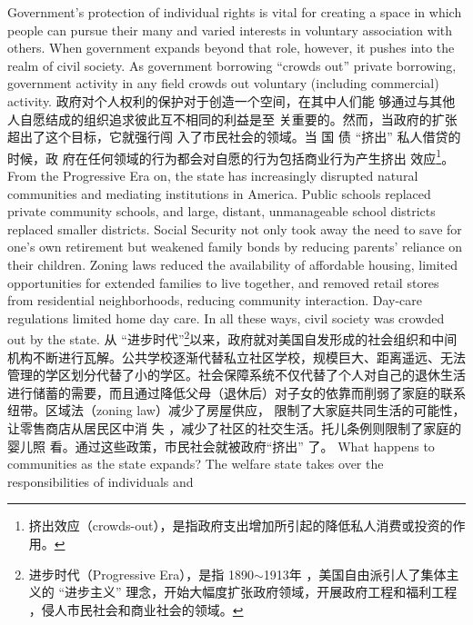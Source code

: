 \begin{paracol}{2}
Government's protection of individual rights is vital for creating a space in which people can pursue their many and varied
interests in voluntary association with others. When government expands beyond that role, however, it pushes into the
realm of civil society. As government borrowing ``crowds out''
private borrowing, government activity in any field crowds out
voluntary (including commercial) activity.
\switchcolumn
政府对个人权利的保护对于创造一个空间，在其中人们能
够通过与其他人自愿结成的组织追求彼此互不相同的利益是至
关重要的。然而，当政府的扩张超出了这个目标，它就强行闯
入了市民社会的领域。当 国 债 “挤出” 私人借贷的时候，政
府在任何领域的行为都会对自愿的行为包括商业行为产生挤出
效应\footnote{挤出效应（crowds-out），是指政府支出增加所引起的降低私人消费或投资的作用。}。
\switchcolumn*
From the Progressive Era on, the state has increasingly disrupted natural communities and mediating institutions in
America. Public schools replaced private community schools,
and large, distant, unmanageable school districts replaced
smaller districts. Social Security not only took away the need to
save for one's own retirement but weakened family bonds by reducing parents' reliance on their children. Zoning laws reduced
the availability of affordable housing, limited opportunities for extended families to live together, and removed retail stores
from residential neighborhoods, reducing community interaction. Day-care regulations limited home day care. In all these
ways, civil society was crowded out by the state.
\switchcolumn
从 “进步时代”\footnote{进步时代（Progressive Era），是指 1890$\sim$1913年 ，美国自由派引人了集体主义的 “进步主义” 理念，开始大幅度扩张政府领域，开展政府工程和福利工程 ，侵人市民社会和商业社会的领域。}以来，政府就对美国自发形成的社会组织和中间机构不断进行瓦解。公共学校逐渐代替私立社区学校，规模巨大、距离遥远、无法管理的学区划分代替了小的学区。社会保障系统不仅代替了个人对自己的退休生活进行储蓄的需要，而且通过降低父母（退休后）对子女的依靠而削弱了家庭的联系纽带。区域法（zoning  law）减少了房屋供应，
限制了大家庭共同生活的可能性，让零售商店从居民区中消
失 ，减少了社区的社交生活。托儿条例则限制了家庭的婴儿照
看。通过这些政策，市民社会就被政府“挤出” 了。
\switchcolumn*
What happens to communities as the state expands? The
welfare state takes over the responsibilities of individuals and

\end{paracol}
